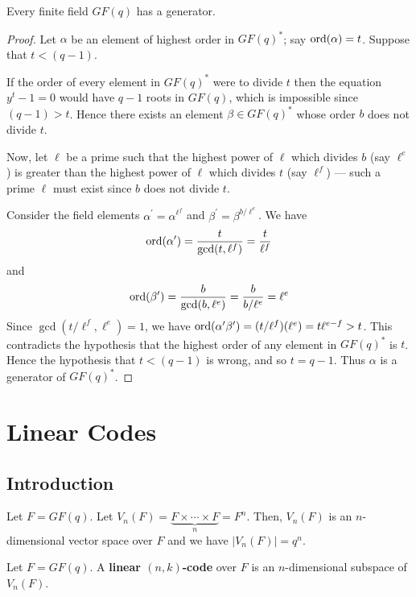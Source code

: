 \begin{thmbox}
    \begin{theorem}
        Every finite field $ GF(q) $ has a generator.
    \end{theorem}
\end{thmbox}

\begin{proof}
    Let $ \alpha $ be an element of highest order in $ GF(q)^* $;
    say $ \operatorname{ord}(\alpha)=t $. Suppose that $ t<(q-1) $.

    If the order of every element in $ GF(q)^* $ were to divide $ t $ then the equation
    $ y^t-1=0 $ would have $ q-1 $ roots in $ GF(q) $, which is impossible
    since $ (q-1)>t $. Hence there exists an element $ \beta\in GF(q)^* $
    whose order $ b $ does not divide $ t $.

    Now, let $ \ell $ be a prime such that the highest power of $ \ell $
    which divides $ b $ (say $ \ell^e $) is greater than the highest
    power of $ \ell $ which divides $ t $ (say $ \ell^f $) --- such a prime
    $ \ell $ must exist since $ b $ does not divide $ t $.

    Consider the field elements $ \alpha^{\prime}=\alpha^{\ell^f} $
    and $ \beta^{\prime}=\beta^{b/\ell^e} $. We have
    \[ \operatorname{ord}(\alpha^{\prime})=\frac{t}{\gcd(t,\ell^f)} =\frac{t}{\ell^f} \]
    and
    \[ \operatorname{ord}(\beta^{\prime})=\frac{b}{\gcd(b,\ell^e)} =\frac{b}{b/\ell^e}=\ell^e \]
    Since $ \gcd(t/\ell^f,\ell^e)=1 $, we have $ \operatorname{ord}(\alpha^{\prime}\beta^{\prime})=
        (t/\ell^f)(\ell^e)=t\ell^{e-f}>t $. This contradicts the hypothesis
    that the highest order of any element in $ GF(q)^* $ is $ t $. Hence the
    hypothesis that $ t<(q-1) $ is wrong, and so $ t=q-1 $. Thus $ \alpha $
    is a generator of $ GF(q)^* $.
\end{proof}

\chapter{Linear Codes}
\section{Introduction}
Let $ F=GF(q) $. Let $ V_n(F)=\underbrace{F\times\cdots\times F}_{n}=F^n $.
Then, $ V_n(F) $ is an $ n $-dimensional vector space over $ F $ and
we have $ |V_n(F)|=q^n $.

\begin{defbox}
    \begin{definition}
        Let $ F=GF(q) $.
        A \textbf{linear $ (n,k) $-code} over $ F $ is an $ n $-dimensional subspace
        of $ V_n(F) $.
    \end{definition}
\end{defbox}

